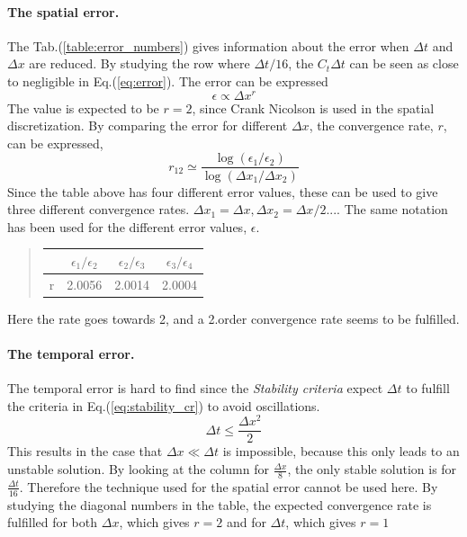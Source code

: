 \documentclass[%
twoside,                 %
final,                   %
10pt]{article}
\begin{document}
\paragraph{The spatial error.}
The Tab.(\ref{table:error_numbers}) gives information about the error when $\Delta t$ and $\Delta x$ are reduced. By studying the row where $\Delta t/16$, the $C_t \Delta t$ can be seen as close to negligible in Eq.(\ref{eq:error}). The error can be expressed 
\begin{equation}
    \epsilon \propto \Delta x^r
\end{equation}
The value is expected to be $r=2$, since Crank Nicolson is used in the spatial discretization. By comparing the error for different $\Delta x$, the convergence rate, $r$, can be expressed, 
\begin{equation} \label{eq:conv_rate}
 r_{12} \simeq \frac{\log(\epsilon_1/\epsilon_2)}{\log(\Delta x_1/\Delta x_2)}
\end{equation}
Since the table above has four different error values, these can be used to give three different convergence rates. $\Delta x_1 = \Delta x, \Delta x_2 = \Delta x/2...$. The same notation has been used for the different error values, $\epsilon$.

\begin{quote}
\begin{tabular}{cccc}
\hline
\multicolumn{1}{c}{  } & \multicolumn{1}{c}{ $\epsilon_1/\epsilon_2$ } & \multicolumn{1}{c}{ $\epsilon_2/\epsilon_3$ } & \multicolumn{1}{c}{ $\epsilon_3/\epsilon_4$ } \\
\hline
r                       & 2.0056                  & 2.0014                  & 2.0004                  \\
\hline
\end{tabular}
\end{quote}

\noindent
Here the rate goes towards 2, and a 2.order convergence rate seems to be fulfilled.
\paragraph{The temporal error.}
The temporal error is hard to find since the \emph{Stability criteria} expect $\Delta t$ to fulfill the criteria in Eq.(\ref{eq:stability_cr}) to avoid oscillations.
\begin{equation} \label{eq:stability_cr}
 \Delta t \leq \frac{\Delta x^2}{2}
\end{equation}
This results in the case that $\Delta x \ll \Delta t$ is impossible, because this only leads to an unstable solution. By looking at the column for $\frac{\Delta x}{8}$, the only stable solution is for $\frac{\Delta t}{16}$. Therefore the technique used for the spatial error cannot be used here. By studying the diagonal numbers in the table, the expected convergence rate is fulfilled for both $\Delta x$, which gives $r = 2$ and for $\Delta t$, which gives $r=1$   
\end{document}
